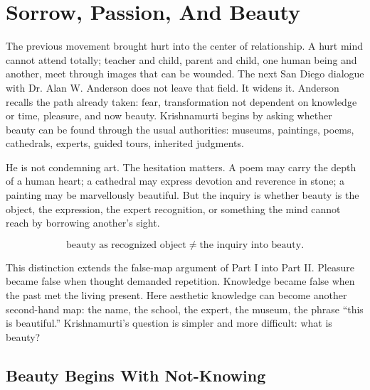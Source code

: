 \documentclass[11pt,oneside]{book}
\begin{document}

\chapter{Sorrow, Passion, And Beauty}

The previous movement brought hurt into the center of relationship. A hurt mind cannot attend totally; teacher and child, parent and child, one human being and another, meet through images that can be wounded. The next San Diego dialogue with Dr. Alan W. Anderson does not leave that field. It widens it. Anderson recalls the path already taken: fear, transformation not dependent on knowledge or time, pleasure, and now beauty. Krishnamurti begins by asking whether beauty can be found through the usual authorities: museums, paintings, poems, cathedrals, experts, guided tours, inherited judgments.

He is not condemning art. The hesitation matters. A poem may carry the depth of a human heart; a cathedral may express devotion and reverence in stone; a painting may be marvellously beautiful. But the inquiry is whether beauty is the object, the expression, the expert recognition, or something the mind cannot reach by borrowing another's sight.

\begin{equation}
\text{beauty as recognized object}
\neq
\text{the inquiry into beauty}.
\end{equation}

This distinction extends the false-map argument of Part I into Part II. Pleasure became false when thought demanded repetition. Knowledge became false when the past met the living present. Here aesthetic knowledge can become another second-hand map: the name, the school, the expert, the museum, the phrase ``this is beautiful.'' Krishnamurti's question is simpler and more difficult: what is beauty?

\section{Beauty Begins With Not-Knowing}
\end{document}
